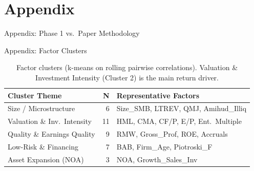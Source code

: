 \documentclass[
  ignorenonframetext,
  aspectratio=169]{beamer}
\begin{document}
\section{Appendix}\label{appendix}

\begin{frame}{Appendix: Phase 1 vs.~Paper Methodology}
\label{appendix-phase-1-vs.-paper-methodology}
\begin{table}[!h]
\centering
\caption{\label{tab:appendix-comparison}Methodology Comparison: Arnott (2023) vs.\ Our Replication}
\centering
{}
\end{table}
\end{frame}

\begin{frame}{Appendix: Factor Clusters}
\label{appendix-factor-clusters}
\begin{table}
\centering
\small
\begin{tabular}{lrl}
\toprule
\textbf{Cluster Theme} & \textbf{N} & \textbf{Representative Factors} \\
\midrule
Size / Microstructure & 6 & Size\_SMB, LTREV, QMJ, Amihud\_Illiq \\
Valuation \& Inv.\ Intensity & 11 & HML, CMA, CF/P, E/P, Ent.\ Multiple \\
Quality \& Earnings Quality & 9 & RMW, Gross\_Prof, ROE, Accruals \\
Low-Risk \& Financing & 7 & BAB, Firm\_Age, Piotroski\_F \\
Asset Expansion (NOA) & 3 & NOA, Growth\_Sales\_Inv \\
\bottomrule
\end{tabular}
\caption{Factor clusters (k-means on rolling pairwise correlations). Valuation \& Investment Intensity (Cluster 2) is the main return driver.}
\end{table}
\end{frame}
\end{document}

